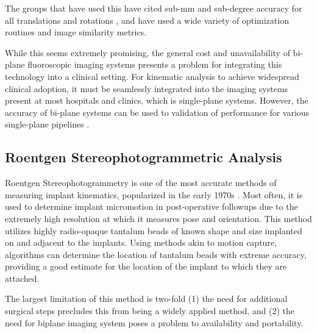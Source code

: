 The groups that have used this have cited sub-mm and sub-degree accuracy for all translations and rotations \cite{burtonAutomaticTrackingHealthy2021,youVivoMeasurement3D2001,bakaStatisticalShapeModelBased2012}, and have used a wide variety of optimization routines and image similarity metrics. 

While this seems extremely promising, the general cost and unavailability of bi-plane fluoroscopic imaging systems presents a problem for integrating this technology into a clinical setting.
For kinematic analysis to achieve widespread clinical adoption, it must be seamlessly integrated into the imaging systems present at most hospitals and clinics, which is single-plane systems.
However, the accuracy of bi-plane systems can be used to validation of performance for various single-plane pipelines \cite{brobergValidationMachineLearning2023}.

\subsection{Roentgen Stereophotogrammetric Analysis}

Roentgen Stereophotogrammetry is one of the most accurate methods of measuring implant kinematics, popularized in the early 1970s \cite{selvikRoentgenStereophotogrammetryMethod1989}.
Most often, it is used to determine implant micromotion in post-operative followups due to the extremely high resolution at which it measures pose and orientation.
This method utilizes highly radio-opaque tantalum beads of known shape and size implanted on and adjacent to the implants.
Using methods akin to motion capture, algorithms can determine the location of tantalum beads with extreme accuracy, providing a good estimate for the location of the implant to which they are attached.

The largest limitation of this method is two-fold (1) the need for additional surgical steps precludes this from being a widely applied method, and (2) the need for biplane imaging system poses a problem to availability and portability.
